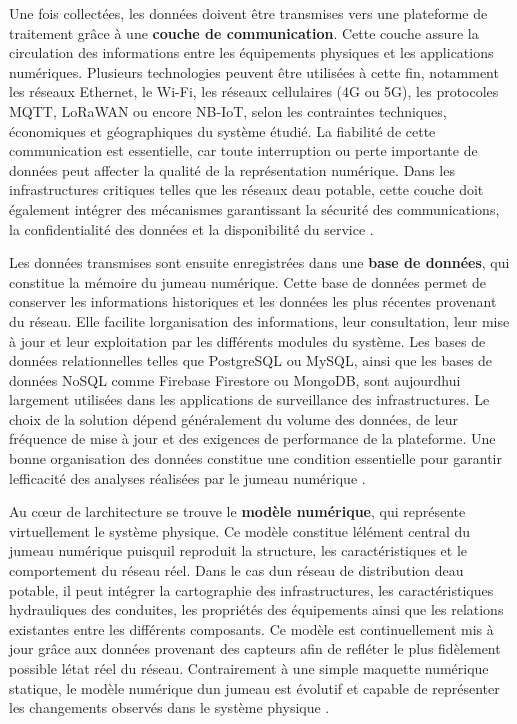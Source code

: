 \documentclass[12pt,a4paper,oneside]{report}
\begin{document}
Une fois collectées, les données doivent être transmises vers une
plateforme de traitement grâce à une \textbf{couche de communication}.
Cette couche assure la circulation des informations entre les
équipements physiques et les applications numériques. Plusieurs
technologies peuvent être utilisées à cette fin, notamment les réseaux
Ethernet, le Wi-Fi, les réseaux cellulaires (4G ou 5G), les protocoles
MQTT, LoRaWAN ou encore NB-IoT, selon les contraintes techniques,
économiques et géographiques du système étudié. La fiabilité de cette
communication est essentielle, car toute interruption ou perte
importante de données peut affecter la qualité de la représentation
numérique. Dans les infrastructures critiques telles que les réseaux
d\textquotesingle eau potable, cette couche doit également intégrer des
mécanismes garantissant la sécurité des communications, la
confidentialité des données et la disponibilité du service \cite{ref62}.

Les données transmises sont ensuite enregistrées dans une \textbf{base
de données}, qui constitue la mémoire du jumeau numérique. Cette base de
données permet de conserver les informations historiques et les données
les plus récentes provenant du réseau. Elle facilite
l\textquotesingle organisation des informations, leur consultation, leur
mise à jour et leur exploitation par les différents modules du système.
Les bases de données relationnelles telles que PostgreSQL ou MySQL,
ainsi que les bases de données NoSQL comme Firebase Firestore ou
MongoDB, sont aujourd\textquotesingle hui largement utilisées dans les
applications de surveillance des infrastructures. Le choix de la
solution dépend généralement du volume des données, de leur fréquence de
mise à jour et des exigences de performance de la plateforme. Une bonne
organisation des données constitue une condition essentielle pour
garantir l\textquotesingle efficacité des analyses réalisées par le
jumeau numérique \cite{ref63}.

Au cœur de l\textquotesingle architecture se trouve le \textbf{modèle
numérique}, qui représente virtuellement le système physique. Ce modèle
constitue l\textquotesingle élément central du jumeau numérique
puisqu\textquotesingle il reproduit la structure, les caractéristiques
et le comportement du réseau réel. Dans le cas d\textquotesingle un
réseau de distribution d\textquotesingle eau potable, il peut intégrer
la cartographie des infrastructures, les caractéristiques hydrauliques
des conduites, les propriétés des équipements ainsi que les relations
existantes entre les différents composants. Ce modèle est
continuellement mis à jour grâce aux données provenant des capteurs afin
de refléter le plus fidèlement possible l\textquotesingle état réel du
réseau. Contrairement à une simple maquette numérique statique, le
modèle numérique d\textquotesingle un jumeau est évolutif et capable de
représenter les changements observés dans le système physique \cite{ref58}.
\end{document}
